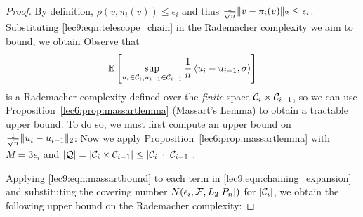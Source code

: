 \begin{proof}
    By definition, $\rho(v, \pi_i(v)) \le \epsilon_i$ and thus $\frac 1 {\sqrt n} \|v - \pi_i(v)\|_2 \le \epsilon_i$. Substituting \eqref{lec9:eqn:telescope_chain} in the Rademacher complexity we aim to bound, we obtain
    Observe that
    \begin{equation}
        \operatorname*{\mathbb{E}}\left[ \sup_{u_i \in \mathcal C_i, u_{i - 1} \in \mathcal C_{i - 1}} \frac 1 n\left\langle u_i-u_{i - 1}, \sigma\right\rangle\right]
    \end{equation}
    is a Rademacher complexity defined over the \emph{finite} space $\mathcal C_i \times \mathcal C_{i - 1}$, so we can use Proposition~\ref{lec6:prop:massartlemma} (Massart's Lemma) to obtain a tractable upper bound. To do so, we must first compute an upper bound on $\frac{1}{\sqrt{n}} \|u_i - u_{i - 1}\|_2$:
    Now we apply Proposition~\ref{lec6:prop:massartlemma} with $M = 3 \epsilon_i$ and $\left\lvert\mathcal Q\right\rvert = \left\lvert\mathcal C_i \times \mathcal C_{i - 1}\right\rvert \leq \left\lvert\mathcal C_i\right\rvert \cdot \left\lvert\mathcal C_{i - 1}\right\rvert$.
    
    Applying \eqref{lec9:eqn:massartbound} to each term in \eqref{lec9:eqn:chaining_expansion} and substituting the covering number $N(\epsilon_i, \mathcal F, L_2[P_n])$ for $|\mathcal C_i|$, we obtain the following upper bound on the Rademacher complexity:
    

\end{proof}
